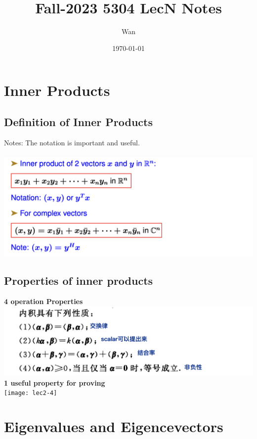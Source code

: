 \documentclass{article}
\begin{document}
\title{Fall-2023 5304 LecN Notes}
\author{Wan}
\date{\today}
\maketitle



\section{Inner Products}
\subsection{Definition of Inner Products}
Notes: The notation is important and useful.\\
\\
\includegraphics[width=1\linewidth]{lec2-3.png}

\subsection{Properties of inner products}
\textbf{4 operation Properties}\\
\includegraphics[width=1\linewidth]{lec2-2.png}
\\
\noindent
\textbf{1 useful property for proving}\\
\texttt{[image: lec2-4]}

\pagebreak
\section{Eigenvalues and Eigencevectors}
\end{document}
